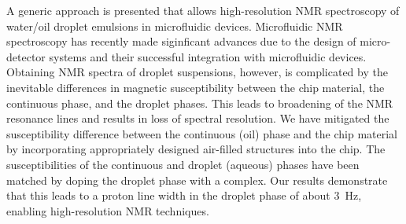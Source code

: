 
A generic approach is presented that allows high-resolution NMR spectroscopy
of water/oil droplet emulsions in microfluidic devices.
Microfluidic NMR spectroscopy has recently made siginficant advances due to the
design of micro-detector systems and their successful integration with
microfluidic devices. Obtaining NMR spectra of droplet suspensions, however,
is complicated by the inevitable differences in magnetic susceptibility
between the chip material, the continuous phase, and the droplet phases.
This leads to broadening of the NMR resonance lines and results in
loss of spectral resolution.
We have mitigated the susceptibility difference between the continuous (oil) phase
and the chip material by incorporating appropriately designed air-filled
structures into the chip.
The susceptibilities of the continuous and droplet (aqueous) phases have been
matched by doping the droplet phase with a  complex.
Our results demonstrate that this leads to a proton line width in the droplet
phase of about 3~Hz, enabling high-resolution NMR techniques.
